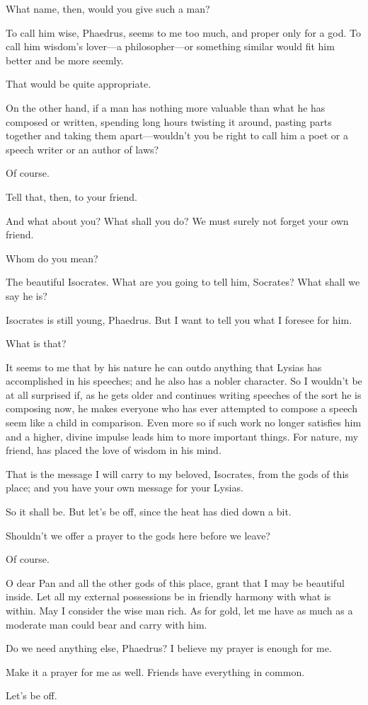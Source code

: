 \sayphaedrus What name, then, would you give such a man?

\saysocrates To call him wise, Phaedrus, seems to me too much, and proper
only for a god. To call him wisdom's lover---a philosopher---or
something similar would fit him better and be more seemly.

\sayphaedrus That would be quite appropriate.

\saysocrates On the other hand, if a man has nothing more valuable than
what he has composed or written, spending long hours twisting it around,
pasting parts together and taking them apart---wouldn't you be right to
call him a poet or a speech writer or an author of laws?

\sayphaedrus Of course.

\saysocrates Tell that, then, to your friend.

\sayphaedrus And what about you? What shall you do? We must surely not
forget your own friend.

\saysocrates Whom do you mean?

\sayphaedrus The beautiful
Isocrates. What are
you going to tell him, Socrates? What shall we say he is?

\saysocrates Isocrates is still young, Phaedrus. But I want to tell you
what I foresee for him.

\sayphaedrus What is that?

\saysocrates It seems to me that by his nature he can outdo anything that
Lysias has accomplished in his speeches; and he also has a nobler
character. So I wouldn't be at all surprised if, as he gets older and
continues writing speeches of the sort he is composing now, he makes
everyone who has ever attempted to compose a speech seem like a child in
comparison. Even more so if such work no longer satisfies him and a
higher, divine impulse leads him to more important things. For nature,
my friend, has placed the love of wisdom in his mind.

That is the message I will carry to my beloved, Isocrates, from the gods
of this place; and you have your own message for your Lysias.

\sayphaedrus So it shall be. But let's be off, since the heat has died down
a bit.

\saysocrates Shouldn't we offer a prayer to the gods here before we leave?

\sayphaedrus Of course.

\saysocrates O dear Pan and all the other gods of this place, grant that I
may be beautiful inside. Let all my external possessions be in friendly 
harmony with what is within. May I consider the wise man rich.
As for gold, let me have as much as a moderate man
could bear and carry with him.

Do we need anything else, Phaedrus? I believe my prayer is enough for
me.

\sayphaedrus Make it a prayer for me as well. Friends have everything in
common.

\saysocrates Let's be off.\crlf
\crlf


